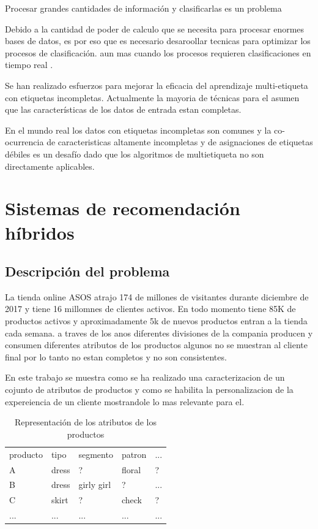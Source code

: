 \documentclass[conference]{IEEEtran}
\begin{document}
Procesar grandes cantidades de información y clasificarlas es un problema 

Debido a la cantidad de poder de calculo que se necesita para procesar enormes bases de datos, es por eso que es necesario desaroollar tecnicas para optimizar los procesos de clasificación. aun mas cuando los procesos requieren clasificaciones en tiempo real .

 


Se han realizado esfuerzos para mejorar la eficacia del aprendizaje multi-etiqueta con etiquetas incompletas. Actualmente la mayoria de técnicas para el  asumen que las características de los datos de entrada estan completas.

En el mundo real los datos con etiquetas incompletas son comunes y la co-ocurrencia de caracteristicas altamente incompletas y de asignaciones de etiquetas débiles es un desafío dado que los algoritmos de multietiqueta no son directamente aplicables.



\section{Sistemas de recomendación híbridos}

\subsection{Descripción del problema}

La tienda online ASOS atrajo 174 de millones de visitantes durante diciembre de 2017 y tiene 16 millomnes de clientes activos. En todo momento tiene 85K de productos activos y aproximadamente 5k de nuevos productos entran a la tienda cada semana. a traves de los anos diferentes divisiones de la compania producen y consumen diferentes atributos de los productos algunos no se muestran al cliente final por lo tanto no estan completos y no son consistentes.

En este trabajo se muestra como se ha realizado una caracterizacion de un cojunto de atributos de productos y como se habilita la personalizacion de la expereiencia de un cliente mostrandole lo mas relevante para el.


\begin{table}[]
\centering
\caption{Representación de los atributos de los productos}
\begin{tabular}{lllll}
producto & tipo  & segmento   & patron & ... \\
A        & dress & ?          & floral & ?   \\
B        & dress & girly girl & ?      & ... \\
C        & skirt & ?          & check  & ?   \\
...      & ...   & ...        & ...  & ...    
\end{tabular}

\end{table}
\end{document}
